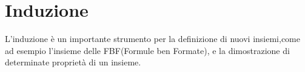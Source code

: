 \chapter{Induzione}
L'induzione è un importante strumento per la definizione di nuovi insiemi,come
ad esempio l'insieme delle FBF(Formule ben Formate), e la dimostrazione di determinate
proprietà di un insieme.






